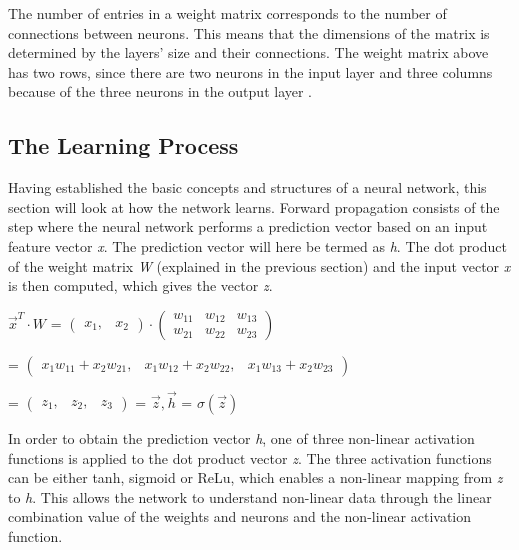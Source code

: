 \indent\newline 
The number of entries in a weight matrix corresponds to the number of connections between neurons. This means that the dimensions of the matrix is determined by the layers' size and their connections. The weight matrix above has two rows, since there are two neurons in the input layer and three columns because of the three neurons in the output layer \cite{opper}.

\subsection{The Learning Process}
Having established the basic concepts and structures of a neural network, this section will look at how the network learns. Forward propagation consists of the step where the neural network performs a prediction vector based on an input feature vector \textit{x}. The prediction vector will here be termed as \textit{h}. The dot product of the weight matrix \textit{W} (explained in the previous section) and the input vector \textit{x} is then computed, which gives the vector \textit{z}.

\indent\newline 
$\overrightarrow{x}^{T} \cdot W$ = $\begin{pmatrix} x_{1}, & x_{2}
\end{pmatrix} \cdot \begin{pmatrix}
w_{11} & w_{12} & w_{13}\\
w_{21} & w_{22} & w_{23}
\end{pmatrix}$
  
\indent\newline 
= $\begin{pmatrix}
x_{1}w_{11}+x_{2}w_{21}, & x_{1}w_{12}+x_{2}w_{22}, & x_{1}w_{13}+x_{2}w_{23}
\end{pmatrix}$

\indent\newline 
= $\begin{pmatrix}
z_{1}, & z_{2}, & z_{3}
\end{pmatrix}$ = $\overrightarrow{z}, \overrightarrow{h}$ = $\sigma(\overrightarrow{z})$

\indent\newline 
In order to obtain the prediction vector \textit{h}, one of three non-linear activation functions is applied to the dot product vector \textit{z}. The three activation functions can be either tanh, sigmoid or ReLu, which enables a non-linear mapping from \textit{z} to \textit{h}. This allows the network to understand non-linear data through the linear combination value of the weights and neurons and the non-linear activation function.

